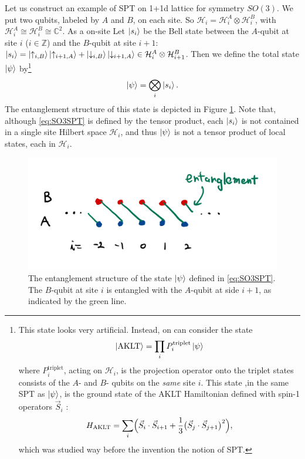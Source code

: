 \documentclass[
]{scrartcl}
\numberwithin{equation}{section}
\theoremstyle{definition}
\theoremstyle{definition}
\theoremstyle{definition}
\theoremstyle{definition}
\theoremstyle{remark}
\begin{document}
Let us construct an example of SPT on 1+1d lattice for symmetry \(SO(3)\).
We put two qubits, labeled by \(A\) and \(B\), on each site. So \(\mathcal{H}_i = \mathcal{H}^A_i \otimes \mathcal{H}^B_i\), with \(\mathcal{H}^A_i \cong \mathcal{H}^B_i \cong \mathbb{C}^2\).
As a on-site
Let \(\ket{s_i}\) be the Bell state between the \(A\)-qubit at site \(i\) (\(i\in\mathbb{Z}\)) and the \(B\)-qubit at site \(i+1\): \(\ket{s_i} = \ket{\uparrow_{i,B}}\ket{\uparrow_{i+1,A}} + \ket{\downarrow_{i,B}} \ket{\downarrow_{i+1,A}} \in \mathcal{H}_{i}^A\otimes \mathcal{H}_{i+1}^B\).
Then we define the total state \(\ket{\psi}\) by\footnote{This state looks very artificial. Instead, on can consider the state
  \begin{equation*}
    \ket{\mathrm{AKLT}} = \prod_i P_i^\text{triplet} \ket{\psi}
  \end{equation*}
  where \(P_i^\text{triplet}\), acting on \(\mathcal{H}_i\), is the projection operator onto the triplet states consists of the \(A\)- and \(B\)- qubits on the \emph{same} site \(i\).
  This state ,in the same SPT as \(\ket{\psi}\), is the ground state of the AKLT Hamiltonian defined with spin-1 operators \(\vec{S}_i\) \textcite{AKLT}:
  \begin{equation*}
    H_{\mathrm{AKLT}} = \sum_i \Bigl(\vec{S}_i \cdot \vec{S}_{i+1} + \frac13 \bigl(\vec{S}_{j} \cdot \vec{S}_{j+1}\bigr)^2\Bigr),
  \end{equation*}
  which was studied way before the invention the notion of SPT.}
\begin{equation}
  \label{eq:SO3SPT}
  \ket{\psi} = \bigotimes_i \ket{s_i}.
\end{equation}
The entanglement structure of this state is depicted in Figure \ref{fig:so3spt}.
Note that, although \eqref{eq:SO3SPT} is defined by the tensor product, each \(\ket{s_i}\) is not contained in a single site Hilbert space \(\mathcal{H}_i\), and thus \(\ket{\psi}\) is not a tensor product of local states, each in \(\mathcal{H}_i\).

\begin{figure}

{\centering \includegraphics[width=0.5\linewidth]{figs/so3spt} 

}

\caption{The entanglement structure of the state \(\ket{\psi}\) defined in \eqref{eq:SO3SPT}. The \(B\)-qubit at site \(i\) is entangled with the \(A\)-qubit at side \(i+1\), as indicated by the green line.}\label{fig:so3spt}
\end{figure}
\end{document}
